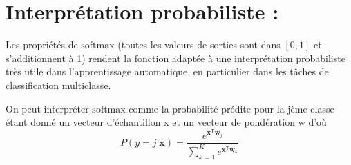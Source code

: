 \documentclass{article}
\begin{document}
\section*{Interprétation probabiliste :}

Les propriétés de $\text{softmax}$ (toutes les valeurs de sorties sont dans $[0,1]$ et s'additionnent à 1) rendent la fonction adaptée à une interprétation probabiliste très utile dans l'apprentissage automatique, en particulier dans les tâches de classification multiclasse.

On peut interpréter $\text{softmax}$ comme la probabilité prédite pour la jème classe étant donné un vecteur d’échantillon x et un vecteur de pondération w d'où \\
\[
P(y=j | \mathbf{x}) = \frac{e^{\mathbf{x}^{\mathsf{T}}\mathbf{w}_j}}{\sum_{k=1}^{K} e^{\mathbf{x}^{\mathsf{T}}\mathbf{w}_k}}
\]
\end{document}
